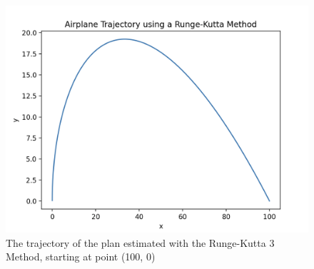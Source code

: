 \documentclass{article}
\begin{document}
\begin{figure}[hbt!]
    \centering
    \includegraphics[width=0.95\linewidth]{images/plane.png}
    \caption{The trajectory of the plan estimated with the Runge-Kutta 3 Method, starting at point (100, 0)}
    \label{fig:plane}
\end{figure}
\end{document}
